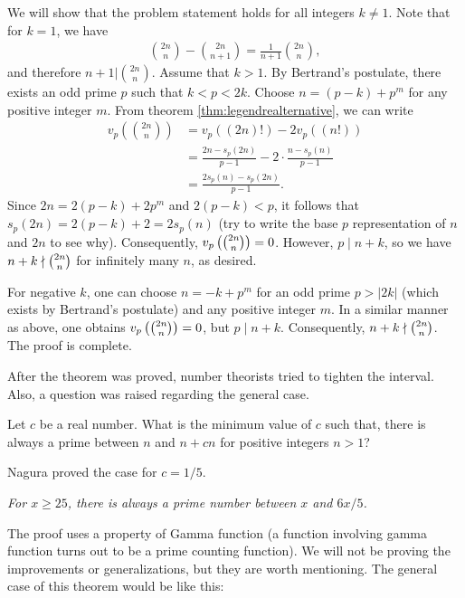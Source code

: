 \documentclass{subfile}
\begin{document}
	\begin{solution}
		We will show that the problem statement holds for all integers $k \neq 1$. Note that for $k=1$, we have
			\begin{align*}
				\binom{2n}{n} - \binom{2n}{n+1} = \frac{1}{n+1}\binom{2n}{n},
			\end{align*}
		and therefore $n+1 | \binom{2n}{n}$. Assume that $k>1$. By Bertrand's postulate, there exists an odd prime $p$ such that $k<p<2k$. Choose $n=(p-k)+p^m$ for any positive integer $m$. From theorem \eqref{thm:legendrealternative}, we can write
			\begin{align*}
				v_p \left(\binom{2n}n\right)  &=  v_p((2n)!) - 2v_p((n!))\\
				&=  \frac{2n - s_p(2n)}{p-1} - 2 \cdot \frac{n - s_p(n)}{p-1}\\
				&=   \frac{2s_p(n) - s_p(2n)}{p - 1}.
			\end{align*}
		Since $2n = 2(p - k) + 2p^m$ and $2(p - k) < p$, it follows that $s_p(2n) = 2(p - k) + 2 = 2s_p(n)$ (try to write the base $p$ representation of $n$ and $2n$ to see why). Consequently, $v_p\left(\tbinom{2n}{n}\right) = 0$. However, $p \mid n + k$, so we have $n + k \nmid \tbinom{2n}{n}$ for infinitely many $n$, as desired.
		
		For negative $k$, one can choose $n = -k + p^m$ for an odd prime $p > |2k|$ (which exists by Bertrand's postulate) and any positive integer $m$. In a similar manner as above, one obtains $v_p\left(\tbinom{2n}{n}\right) = 0$, but $p \mid n + k$. Consequently, $n + k \nmid \tbinom{2n}{n}$. The proof is complete.
	\end{solution}
After the theorem was proved, number theorists tried to tighten the interval. Also, a question was raised regarding the general case.
	\begin{problem}
		Let $c$ be a real number. What is the minimum value of $c$ such that, there is always a prime between $n$ and $n+cn$ for positive integers $n>1$?
	\end{problem}
Nagura \cite{nagura} proved the case for $c=1/5$.
	\begin{theorem}[Nagura]\slshape
		For $x\geq25$, there is always a prime number between $x$ and $6x/5$.
	\end{theorem}
The proof uses a property of Gamma function (a function involving gamma function turns out to be a prime counting function). We will not be proving the improvements or generalizations, but they are worth mentioning. The general case of this theorem would be like this:
\end{document}
